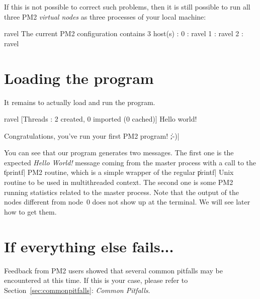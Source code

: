 If this is not possible to correct such problems, then it is still
possible to run all three PM2 \emph{virtual nodes} as three processes
of your local machine:
\begin{shell}
ravel%
The current PM2 configuration contains 3 host(s) :
0 : ravel
1 : ravel
2 : ravel
\end{shell}

\section{Loading the program}

It remains to actually load and run the program.
\begin{shell}
ravel%
[Threads : 2 created, 0 imported (0 cached)]
Hello world!
\end{shell}
Congratulations, you've run your first PM2 program! \|;-)|

You can see that our program generates two messages. The first one is
the expected \emph{Hello World!} message coming from the master
process with a call to the \|tprintf| PM2 routine, which is a simple
wrapper of the regular \|printf| Unix routine to be used in
multithreaded context. The second one is some PM2 running statistics
related to the master process. Note that the output of the nodes
different from node~0 does not show up at the terminal. We will see
later how to get them.

\section{If everything else fails...}

Feedback from PM2 users showed that several common pitfalls may be
encountered at this time. If this is your case, please refer to
Section~\ref{sec:commonpitfalls}: \emph{Common Pitfalls}. 
